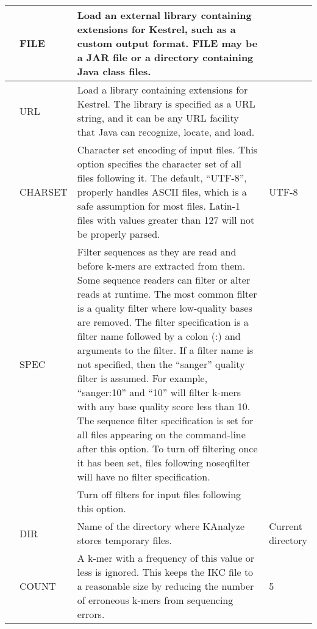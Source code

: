 \begin{small}
\begin{longtable}{|p{\optwidth}|p{\argwidth}|p{\dscwidth}|p{}|}
		\lopt{lib} & FILE &
		Load an external library containing extensions for Kestrel, such as a custom output format. FILE may be a JAR file or a directory containing Java class files.
		&
		\\ \hline
		
		\lopt{liburl} & URL &
		Load a library containing extensions for Kestrel. The library is specified as a URL string, and it can be any URL facility that Java can recognize, locate, and load.
		&
		\\ \hline
		
		\lopt{charset} & CHARSET &
		Character set encoding of input files. This option specifies the character set of all files following it. The default, ``UTF-8'', properly handles ASCII files, which is a safe assumption for most files. Latin-1 files with values greater than 127 will not be properly parsed.
		& UTF-8
		\\ \hline
		
		\optbox{\lopt{seqfilter}\\\lopt{quality}} & SPEC &
		Filter sequences as they are read and before k-mers are extracted from them. Some sequence readers can filter or alter reads at runtime. The most common filter is a quality filter where low-quality bases are removed. The filter specification is a filter name followed by a colon (:) and arguments to the filter. If a filter name is not specified, then the ``sanger'' quality filter is assumed. For example, ``sanger:10'' and ``10'' will filter k-mers with any base quality score less than 10. The sequence filter specification is set for all files appearing on the command-line after this option. To turn off filtering once it has been set, files following \ddash{}noseqfilter will have no filter specification.
		&
		\\ \hline
		
		\lopt{noseqfilter} & &
		Turn off filters for input files following this option.
		&
		\\ \hline
		
		\lopt{temploc} & DIR &
		Name of the directory where KAnalyze stores temporary files.
		& \parbox{2cm}{Current\\directory}
		\\ \hline
		
		 & COUNT &
		A k-mer with a frequency of this value or less is ignored. This keeps the IKC file to a reasonable size by reducing the number of erroneous k-mers from sequencing errors.
		& 5
		\\ \hline
		

\end{longtable}
\end{small}
